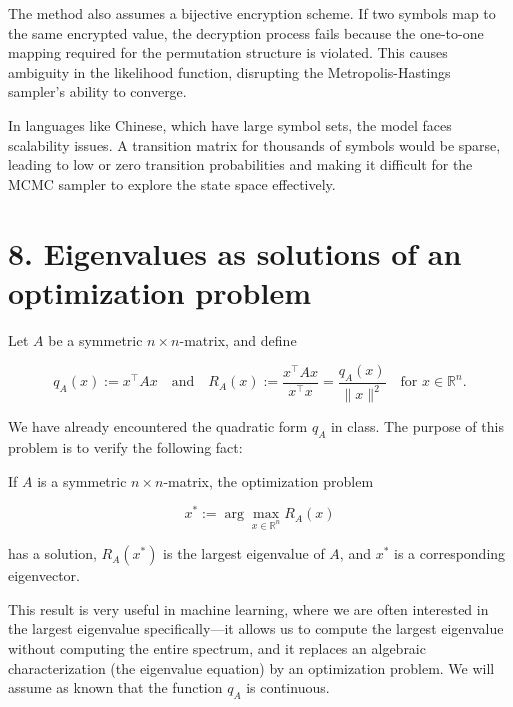 \documentclass{article}
\begin{document}
\begin{enumerate}
    The method also assumes a bijective encryption scheme. If two symbols map to the same encrypted value, the decryption process fails because the one-to-one mapping required for the permutation structure is violated. This causes ambiguity in the likelihood function, disrupting the Metropolis-Hastings sampler’s ability to converge.
    \vspace{0.8em} 
    
    In languages like Chinese, which have large symbol sets, the model faces scalability issues. A transition matrix for thousands of symbols would be sparse, leading to low or zero transition probabilities and making it difficult for the MCMC sampler to explore the state space effectively.

    \vspace{10pt}


\end{enumerate}

\section*{8. Eigenvalues as solutions of an optimization problem}

Let \( A \) be a symmetric \( n \times n \)-matrix, and define

\[
q_A(x) := x^\top A x \quad \text{and} \quad R_A(x) := \frac{x^\top A x}{x^\top x} = \frac{q_A(x)}{\|x\|^2} \quad \text{for } x \in \mathbb{R}^n.
\]

\noindent We have already encountered the quadratic form \( q_A \) in class. The purpose of this problem is to verify the following fact:
\vspace{1em}

\noindent If \( A \) is a symmetric \( n \times n \)-matrix, the optimization problem

\[
x^* := \arg \max_{x \in \mathbb{R}^n} R_A(x)
\]

\noindent  has a solution, \( R_A(x^*) \) is the largest eigenvalue of \( A \), and \( x^* \) is a corresponding eigenvector.
\vspace{1em}

\noindent This result is very useful in machine learning, where we are often interested in the largest eigenvalue specifically—it allows us to compute the largest eigenvalue without computing the entire spectrum, and it replaces an algebraic characterization (the eigenvalue equation) by an optimization problem. We will assume as known that the function \( q_A \) is continuous.
\vspace{0.5em}
\end{document}
